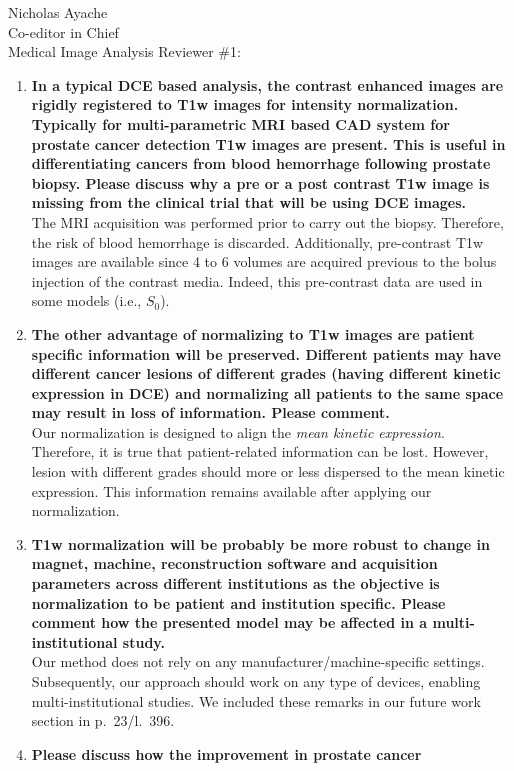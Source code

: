 \documentclass{letter}
\begin{document}
\begin{letter}{Nicholas Ayache \\ Co-editor in Chief \\ Medical Image Analysis}
  Reviewer \#1:
  \begin{enumerate}
  \item \textbf{In a typical DCE based analysis, the contrast
      enhanced images are rigidly registered to T1w images for
      intensity normalization. Typically for multi-parametric MRI
      based CAD system for prostate cancer detection T1w images
      are present. This is useful in differentiating cancers from
      blood hemorrhage following prostate biopsy. Please discuss
      why a pre or a post contrast T1w image is missing from the
      clinical trial that will be using DCE images.}\\
    The MRI acquisition was performed prior to carry out the
    biopsy. Therefore, the risk of blood hemorrhage is discarded.
    Additionally, pre-contrast T1w images are available since 4 to 6
    volumes are acquired previous to the bolus injection of the
    contrast media. Indeed, this pre-contrast data are used in some
    models (i.e., $S_0$).
  \item \textbf{The other advantage of normalizing to T1w images are
      patient specific information will be preserved. Different
      patients may have different cancer lesions of different grades
      (having different kinetic expression in DCE) and normalizing all
      patients to the same space may result in loss of
      information. Please comment.}\\
    Our normalization is designed to align the \emph{mean kinetic
      expression}. Therefore, it is true that patient-related
    information can be lost. However, lesion with different grades
    should more or less dispersed to the mean kinetic expression. This
    information remains available after applying our normalization.
  \item \textbf{T1w normalization will be probably be more robust to
      change in magnet, machine, reconstruction software and
      acquisition parameters across different institutions as the
      objective is normalization to be patient and institution
      specific. Please comment how the presented model may be affected
      in a multi-institutional study.}\\
    Our method does not rely on any manufacturer/machine-specific settings.
    Subsequently, our approach should work on any type
    of devices, enabling multi-institutional studies. We included
    these remarks in our future work section in p.~23/l.~396.
  \item \textbf{Please discuss how the improvement in prostate cancer
}
\end{enumerate}
\end{letter}
\end{document}
